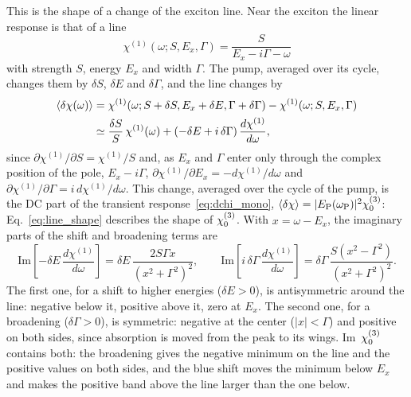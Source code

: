 \documentclass[10pt,a4paper]{paper}
\begin{document}
This is the shape of a change of the exciton line. Near the exciton the linear response is that of a line
\begin{equation}
\chi^{(1)}(\omega;S,E_x,\Gamma) = \frac{S}{E_x-i\Gamma-\omega}
\label{eq:line_shape_eq}
\end{equation}
with strength $S$, energy $E_x$ and width $\Gamma$. The pump, averaged over its cycle, changes them by $\delta S$,
$\delta E$ and $\delta\Gamma$, and the line changes by
\begin{equation}
\begin{aligned}
\langle\delta\chi(\omega)\rangle &= \chi^{(1)}(\omega;S+\delta S,E_x+\delta E,\Gamma+\delta\Gamma)-\chi^{(1)}(\omega;S,E_x,\Gamma)
\\ &\simeq \frac{\delta S}{S}\,\chi^{(1)}(\omega)+\left(-\delta E+i\,\delta\Gamma\right)\frac{d\chi^{(1)}}{d\omega} ,
\end{aligned}
\label{eq:line_shape}
\end{equation}
since $\partial\chi^{(1)}/\partial S = \chi^{(1)}/S$ and, as $E_x$ and $\Gamma$ enter only through the complex position
of the pole, $E_x-i\Gamma$, $\partial\chi^{(1)}/\partial E_x = -d\chi^{(1)}/d\omega$ and $\partial\chi^{(1)}/\partial\Gamma
= i\,d\chi^{(1)}/d\omega$. This change, averaged over the cycle of the pump, is the DC part of the transient
response~\eqref{eq:dchi_mono}, $\langle\delta\chi\rangle = |E_{\mathrm{P}}(\omega_{\mathrm{P}})|^2\chi^{(3)}_{0}$: Eq.~\eqref{eq:line_shape} describes the shape
of $\chi^{(3)}_{0}$.
With $x = \omega-E_x$, the imaginary parts of the shift and broadening terms are
\begin{equation}
\mathrm{Im}\left[-\delta E\,\frac{d\chi^{(1)}}{d\omega}\right] = \delta E\,\frac{2S\Gamma x}{(x^2+\Gamma^2)^2} , \qquad
\mathrm{Im}\left[i\,\delta\Gamma\,\frac{d\chi^{(1)}}{d\omega}\right] = \delta\Gamma\,\frac{S(x^2-\Gamma^2)}{(x^2+\Gamma^2)^2} .
\end{equation}
The first one, for a shift to higher energies ($\delta E > 0$), is antisymmetric around the line: negative below it,
positive above it, zero at $E_x$. The second one, for a broadening ($\delta\Gamma > 0$), is symmetric: negative at the
center ($|x| < \Gamma$) and positive on both sides, since absorption is moved from the peak to its wings. Im~$\chi^{(3)}_{0}$
contains both: the broadening gives the negative minimum on the line and the positive values on both sides, and the
blue shift moves the minimum below $E_x$ and makes the positive band above the line larger than the one below.
\end{document}
